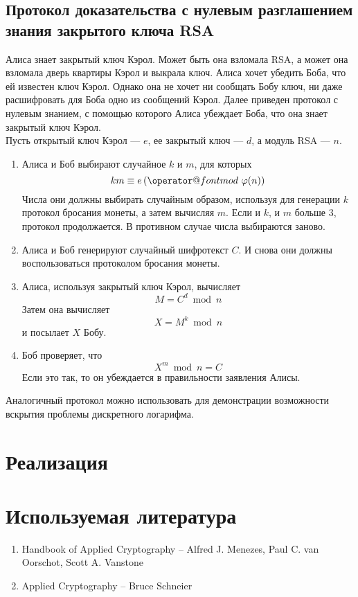 \documentclass[12pt,a4paper]{report}
\makeatletter
\def\imod#1{\allowbreak\,({\operator@font mod}\ #1)}
\makeatother
\begin{document}
\section{Протокол доказательства с
нулевым разглашением знания закрытого ключа RSA}

Алиса знает закрытый ключ Кэрол. Может быть она взломала RSA, а
может она взломала дверь квартиры Кэрол и выкрала ключ. Алиса
хочет убедить Боба, что ей известен ключ Кэрол. Однако она не
хочет ни сообщать Бобу ключ, ни даже расшифровать для Боба одно
из сообщений Кэрол. Далее приведен протокол с нулевым знанием,
с помощью которого Алиса убеждает Боба, что она знает закрытый
ключ Кэрол.\\

Пусть открытый ключ Кэрол --- $e$, ее закрытый ключ --- $d$, а
модуль RSA --- $n$.

\begin{enumerate}
\item Алиса и Боб выбирают случайное $k$ и $m$, 
для которых $$km \equiv e \imod{\varphi(n)}$$ Числа они 
должны выбирать случайным образом, используя для
генерации $k$ протокол бросания монеты, а затем 
вычисляя $m$. Если и $k$, и $m$ больше $3$,
протокол продолжается. В противном случае числа
выбираются заново.
\item Алиса и Боб генерируют случайный шифротекст
$C$. И снова они должны воспользоваться протоколом
бросания монеты.
\item Алиса, используя закрытый ключ Кэрол, вычисляет
$$M = C^d\bmod{n}$$ Затем она вычисляет 
$$ X = M^k\bmod{n}$$ и посылает $X$ Бобу.
\item Боб проверяет, что $$X^m\bmod{n} = C$$
Если это так, то он убеждается в правильности 
заявления Алисы.
\end{enumerate}

Аналогичный протокол можно использовать для демонстрации
возможности вскрытия проблемы дискретного логарифма.


\chapter{Реализация}


\chapter*{Используемая литература}

\begin{enumerate}
\item Handbook of Applied Cryptography -- Alfred J. Menezes, Paul C. van Oorschot, Scott A. Vanstone
\item Applied Cryptography -- Bruce Schneier
\end{enumerate}
\end{document}
